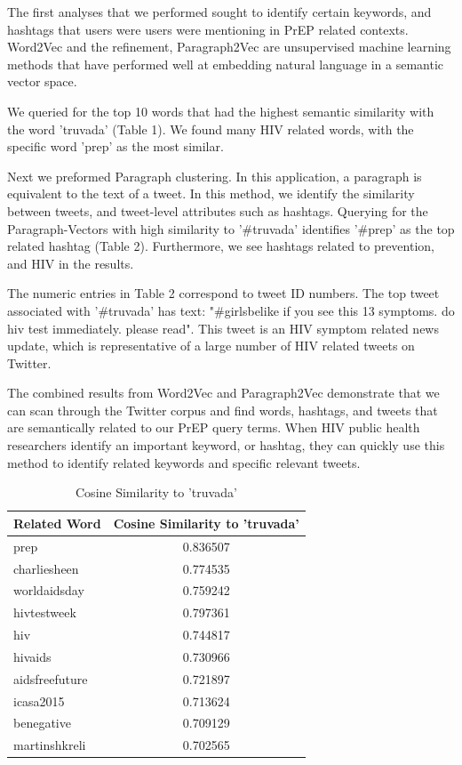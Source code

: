 \documentclass{sig-alternate-05-2015}
\begin{document}

The first analyses that we performed sought to identify certain keywords, and hashtags that users were users were mentioning in PrEP related contexts. Word2Vec and the refinement, Paragraph2Vec are unsupervised machine learning methods that have performed well at embedding natural language in a semantic vector space.

We queried for the top 10 words that had the highest semantic similarity with the word 'truvada' (Table 1). We found many HIV related words, with the specific word 'prep' as the most similar.

Next we preformed Paragraph clustering. In this application, a paragraph is equivalent to the text of a tweet. In this method, we identify the similarity between tweets, and tweet-level attributes such as hashtags. Querying for the Paragraph-Vectors with high similarity to '\#truvada' identifies '\#prep' as the top related hashtag (Table 2). Furthermore, we see hashtags related to prevention, and HIV in the results.

The numeric entries in Table 2 correspond to tweet ID numbers. The top tweet associated with '\#truvada' has text: "\#girlsbelike if you see this 13 symptoms. do hiv test immediately. please read". This tweet is an HIV symptom related news update, which is representative of a large number of HIV related tweets on Twitter.

The combined results from Word2Vec and Paragraph2Vec demonstrate that we can scan through the Twitter corpus and find words, hashtags, and tweets that are semantically related to our PrEP query terms. When HIV public health researchers identify an important keyword, or hashtag, they can quickly use this method to identify related keywords and specific relevant tweets.

\begin{table}
\centering
\caption{Cosine Similarity to 'truvada'}
\begin{tabular}{|l|c|} \hline
Related Word & Cosine Similarity to 'truvada'\\ \hline
prep & 0.836507\\ \hline
charliesheen & 0.774535\\ \hline
worldaidsday & 0.759242\\ \hline
hivtestweek & 0.797361\\ \hline
hiv & 0.744817\\ \hline
hivaids & 0.730966\\ \hline
aidsfreefuture & 0.721897\\ \hline
icasa2015 & 0.713624\\ \hline
benegative & 0.709129\\ \hline
martinshkreli & 0.702565\\ \hline
\hline\end{tabular}
\end{table}
\end{document}

